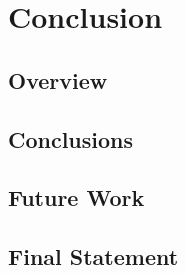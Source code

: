\chapter{Conclusion}
\section{Overview}
\section{Conclusions}
\section{Future Work}
\section{Final Statement}